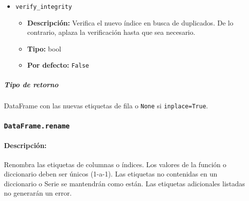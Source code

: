 \begin{itemize}
            \item \texttt{verify\_integrity}
                \begin{itemize}
                    \item \textbf{Descripción:} Verifica el nuevo índice en busca de duplicados. De lo contrario, aplaza la verificación hasta que sea necesario.
                    \item \textbf{Tipo:} bool
                    \item \textbf{Por defecto:} \texttt{False}
                \end{itemize}
        \end{itemize}

        \subparagraph{Tipo de retorno}
        DataFrame con las nuevas etiquetas de fila o \texttt{None} si \texttt{inplace=True}.


        \subsubsection{\texttt{DataFrame.rename}}

        \paragraph{Descripción:}
        Renombra las etiquetas de columnas o índices. Los valores de la función o diccionario deben ser únicos (1-a-1). Las etiquetas no contenidas en un diccionario o Serie se mantendrán como están. Las etiquetas adicionales listadas no generarán un error.

